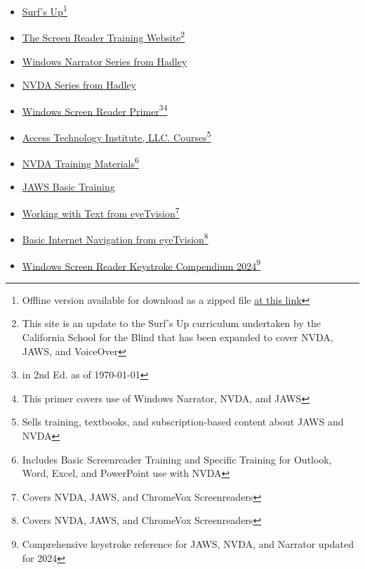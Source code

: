 \begin{itemize}
 \item \href{https://www.freedomscientific.com/SurfsUp/}{Surf's Up}\footnote{\raggedright Offline version available for download as a zipped file \href{https://support.freedomscientific.com/SurfsUp/ZIP\_Surfs\_Up.zip}{at this link}}
 \item \href{https://srt.csb-cde.ca.gov/}{The Screen Reader Training Website}\footnote{\raggedright This site is an update to the Surf's Up curriculum undertaken by the California School for the Blind that has been expanded to cover NVDA, JAWS, and VoiceOver}
 \item \href{https://hadley.edu/workshops/windows-narrator-series}{Windows Narrator Series from Hadley}
 \item \href{https://hadley.edu/workshops/nvda-screen-reader-series}{NVDA Series from Hadley}
 \item \href{https://carroll.org/the-windows-screen-reader-primer-all-the-basics-and-more-second-edition/}{Windows Screen Reader Primer}\footnote{\raggedright in 2nd Ed. as of \today}\footnote{\raggedright This primer covers use of Windows Narrator, NVDA, and JAWS}
 \item \href{https://www.blind.training/}{Access Technology Institute, LLC. Courses}\footnote{\raggedright Sells training, textbooks, and subscription-based content about JAWS and NVDA}
 \item \href{https://www.nvaccess.org/product/nvda-productivity-bundle/}{NVDA Training Materials}\footnote{\raggedright Includes Basic Screenreader Training and Specific Training for Outlook, Word, Excel, and PowerPoint use with NVDA}
 \item \href{https://support.freedomscientific.com/Training/JAWS-Basic-Training.zip}{JAWS Basic Training}
 \item \href{https://eyetvision.org/screen-reader-curriculum-landing-page/\#wwt2}{Working with Text from eyeTvision}\footnote{\raggedright Covers NVDA, JAWS, and ChromeVox Screenreaders}
 \item \href{https://eyetvision.org/screen-reader-curriculum-landing-page/\#bin2}{Basic Internet Navigation from eyeTvision}\footnote{\raggedright Covers NVDA, JAWS, and ChromeVox Screenreaders}
 \item \href{https://shop.nbp.org/products/windows-screen-reader-keystroke-compendium-2024-update}{Windows Screen Reader Keystroke Compendium 2024}\footnote{\raggedright Comprehensive keystroke reference for JAWS, NVDA, and Narrator updated for 2024}
\end{itemize}


